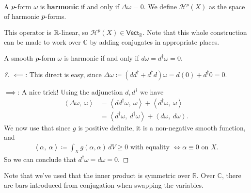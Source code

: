 \begin{definition}

A \(p{\hbox{-}}\)form \(\omega\) is \textbf{harmonic} if and only if
\(\Delta \omega = 0\). We define \(\mathcal{H}^p(X)\) as the space of
harmonic \(p{\hbox{-}}\)forms.

\end{definition}

\begin{remark}

This operator is \({\mathbb{R}}{\hbox{-}}\)linear, so
\(\mathcal{H}^p(X) \in {\mathsf{Vect}}_{\mathbb{R}}\). Note that this
whole construction can be made to work over \({\mathbb{C}}\) by adding
conjugates in appropriate places.

\end{remark}

\begin{proposition}[?]

A smooth \(p{\hbox{-}}\)form \(\omega\) is harmonic if and only if
\(d \omega = d^\dagger \omega = 0\).

\end{proposition}

\begin{proof}[?]

\(\impliedby\): This direct is easy, since
\(\Delta \omega \coloneqq(dd^\dagger + d^\dagger d) \omega = d(0) + d^\dagger 0 = 0\).

\(\implies\): A nice trick! Using the adjunction \(d, d^\dagger\) we
have
\begin{align*}
{\left\langle { \Delta \omega},~{ \omega} \right\rangle}
&=
{\left\langle { d d^\dagger \omega},~{ \omega} \right\rangle} +
{\left\langle {d^\dagger \omega},~{ \omega} \right\rangle}
\\
&=
{\left\langle { d^\dagger \omega},~{ d^\dagger \omega} \right\rangle} +
{\left\langle {d \omega},~{ d \omega} \right\rangle}
.\end{align*}
We now use that since \(g\) is positive definite, it is a non-negative
smooth function, and
\begin{align*}
{\left\langle { \alpha},~{ \alpha} \right\rangle} \coloneqq\int_X g( \alpha, \alpha) \, dV \geq 0 \text{ with equality } \iff \alpha \equiv 0 \text{ on } X
.\end{align*}
So we can conclude that \(d^\dagger \omega = d \omega = 0\).

\end{proof}

\begin{warnings}

Note that we've used that the inner product is symmetric over
\({\mathbb{R}}\). Over \({\mathbb{C}}\), there are bars introduced from
conjugation when swapping the variables.

\end{warnings}

